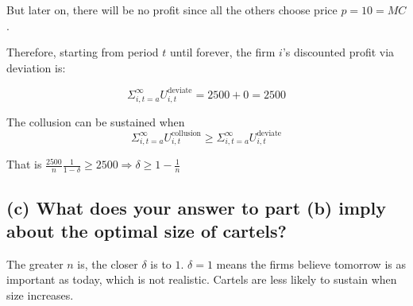 \documentclass{article}
\begin{document}
\smallskip

But later on, there will be no profit since all the others choose price $p=10=MC$. 

Therefore, starting from period $t$ until forever, the firm $i$'s discounted profit via deviation is:

$$\Sigma^{\infty}_{i,t=a} U^{\text{deviate}}_{i,t}= 2500  + 0 =2500$$

The collusion can be sustained when $$\Sigma^{\infty}_{i,t=a} U^{\text{collusion}}_{i,t} \ge \Sigma^{\infty}_{i,t=a} U^{\text{deviate}}_{i,t}$$

That is $\frac {2500}{n} \frac{1}{1-\delta} \ge 2500 \Rightarrow \delta \ge 1 -\frac{1}{n}$

\subsection*{(c) What does your answer to part (b) imply about the optimal size of cartels?}

The greater $n$ is, the closer $\delta$ is to $1$. $\delta = 1$ means the firms believe tomorrow is as important as today, which is not realistic. Cartels are less likely to sustain when size increases.
\end{document}
